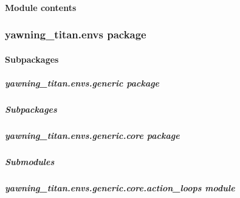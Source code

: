 \documentclass[letterpaper,10pt,english]{sphinxmanual}
\begin{document}
\begin{fulllineitems}
\begin{fulllineitems}
\begin{quote}
\begin{description}
\end{description}\end{quote}

\end{fulllineitems}


\end{fulllineitems}



\paragraph{Module contents}
\label{\detokenize{source/yawning_titan.agents:module-yawning_titan.agents}}\label{\detokenize{source/yawning_titan.agents:module-contents}}

\subsubsection{yawning\_titan.envs package}
\label{\detokenize{source/yawning_titan.envs:yawning-titan-envs-package}}\label{\detokenize{source/yawning_titan.envs::doc}}

\paragraph{Subpackages}
\label{\detokenize{source/yawning_titan.envs:subpackages}}

\subparagraph{yawning\_titan.envs.generic package}
\label{\detokenize{source/yawning_titan.envs.generic:yawning-titan-envs-generic-package}}\label{\detokenize{source/yawning_titan.envs.generic::doc}}

\subparagraph{Subpackages}
\label{\detokenize{source/yawning_titan.envs.generic:subpackages}}

\subparagraph{yawning\_titan.envs.generic.core package}
\label{\detokenize{source/yawning_titan.envs.generic.core:yawning-titan-envs-generic-core-package}}\label{\detokenize{source/yawning_titan.envs.generic.core::doc}}

\subparagraph{Submodules}
\label{\detokenize{source/yawning_titan.envs.generic.core:submodules}}

\subparagraph{yawning\_titan.envs.generic.core.action\_loops module}
\label{\detokenize{source/yawning_titan.envs.generic.core:module-yawning_titan.envs.generic.core.action_loops}}\label{\detokenize{source/yawning_titan.envs.generic.core:yawning-titan-envs-generic-core-action-loops-module}}
\end{document}
